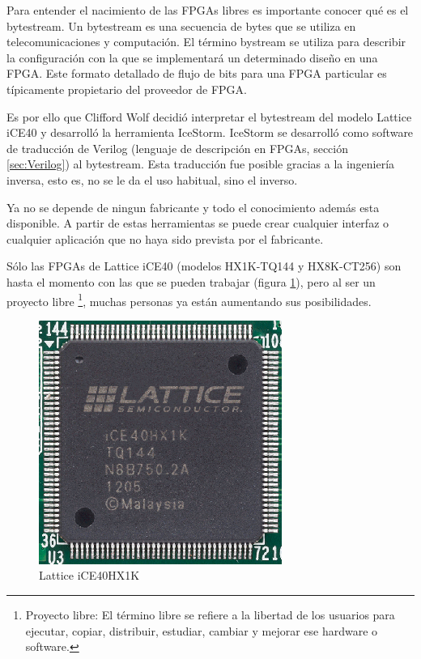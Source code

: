 Para entender el nacimiento de las FPGAs libres es importante conocer qué es el bytestream. \newline
Un bytestream es una secuencia de bytes que se utiliza en telecomunicaciones y computación. El término bystream se utiliza para describir la configuración con la que se implementará un determinado diseño en una FPGA. Este formato detallado de flujo de bits para una FPGA particular es típicamente propietario del proveedor de FPGA. \newline

Es por ello que Clifford Wolf decidió interpretar el bytestream del modelo Lattice iCE40 y desarrolló la herramienta IceStorm. \newline
IceStorm se desarrolló como software de traducción de Verilog (lenguaje de descripción en FPGAs, sección \ref{sec:Verilog}) al bytestream. Esta traducción fue posible gracias a la ingeniería inversa, esto es, no se le da el uso habitual, sino el inverso. 

Ya no se depende de ningun fabricante y todo el conocimiento además esta disponible. A partir de estas herramientas se puede crear cualquier interfaz o cualquier aplicación que no haya sido prevista por el fabricante. \newline

Sólo las FPGAs de Lattice iCE40 (modelos HX1K-TQ144 y HX8K-CT256) son hasta el momento con las que se pueden trabajar (figura \ref{fig:lattice}), pero al ser un proyecto libre \footnote{Proyecto libre: El término libre se refiere a la libertad de los usuarios para ejecutar, copiar, distribuir, estudiar, cambiar y mejorar ese hardware o software.}, muchas personas ya están aumentando sus posibilidades.
\begin{center}
	\begin{figure}[H]
		\center
		\includegraphics[trim = 0mm 0mm 0mm 0mm, clip,scale=0.5]{imagenes/EstadoArte/lattice.png}
		\caption{Lattice iCE40HX1K}
		\label{fig:lattice}
	\end{figure}
\end{center}

